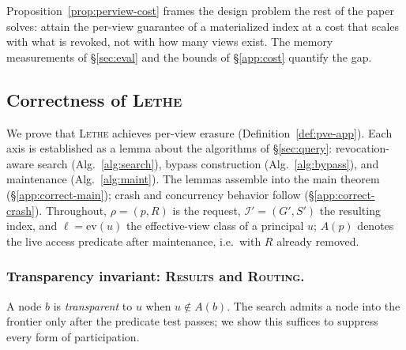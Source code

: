 \documentclass[sigconf, nonacm, review]{acmart}
\begin{document}
Proposition~\ref{prop:perview-cost} frames the design problem the rest of the
paper solves: attain the per-view guarantee of a materialized index at a cost
that scales with what is revoked, not with how many views exist. The memory
measurements of \S\ref{sec:eval} and the bounds of \S\ref{app:cost} quantify
the gap.

\subsection{Correctness of \textsc{Lethe}}
\label{app:correct}

We prove that \textsc{Lethe} achieves per-view erasure
(Definition~\ref{def:pve-app}). Each axis is established as a lemma about the
algorithms of \S\ref{sec:query}: revocation-aware search (Alg.~\ref{alg:search}),
bypass construction (Alg.~\ref{alg:bypass}), and maintenance
(Alg.~\ref{alg:maint}). The lemmas assemble into the main theorem
(\S\ref{app:correct-main}); crash and concurrency behavior follow
(\S\ref{app:correct-crash}). Throughout, $\rho=(p,R)$ is the request,
$\mathcal{I}'=(G',S')$ the resulting index, and $\ell=\mathrm{ev}(u)$ the
effective-view class of a principal $u$; $A(p)$ denotes the live access
predicate after maintenance, i.e.\ with $R$ already removed.

\subsubsection{Transparency invariant: \textsc{Results} and \textsc{Routing}.}
\label{app:correct-route}
A node $b$ is \emph{transparent} to $u$ when $u\notin A(b)$. The search admits
a node into the frontier only after the predicate test passes; we show this
suffices to suppress every form of participation.
\end{document}
